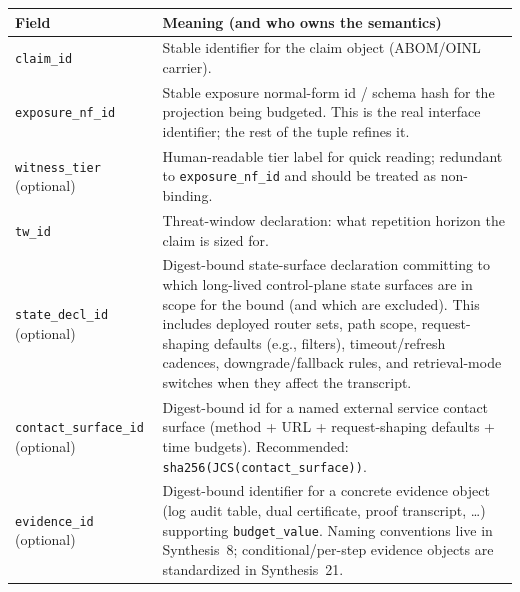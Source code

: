 \documentclass[11pt]{article}
\begin{document}
\begin{table}[t]
\centering
\begin{tabularx}{\linewidth}{@{}lX@{}}
\toprule
Field & Meaning (and who owns the semantics) \\
\midrule
\texttt{claim\_id} & Stable identifier for the claim object (ABOM/OINL carrier).\cite{series:abomoinl} \\
\texttt{exposure\_nf\_id} & Stable exposure normal-form id / schema hash for the projection being budgeted. This is the real interface identifier; the rest of the tuple refines it.\cite{series:traceifaces} \\
\texttt{witness\_tier} (optional) & Human-readable tier label for quick reading; redundant to \texttt{exposure\_nf\_id} and should be treated as non-binding.\cite{series:traceifaces} \\
\texttt{tw\_id} & Threat-window declaration: what repetition horizon the claim is sized for.\cite{series:threatwindows} \\
\texttt{state\_decl\_id} (optional) & Digest-bound state-surface declaration committing to which long-lived control-plane state surfaces are in scope for the bound (and which are excluded). This includes deployed router sets, path scope, request-shaping defaults (e.g., filters), timeout/refresh cadences, downgrade/fallback rules, and retrieval-mode switches when they affect the transcript.\cite{series:state1,series:deployedsurfaces,series:workedexample} \\
\texttt{contact\_surface\_id} (optional) & Digest-bound id for a named external service contact surface (method + URL + request-shaping defaults + time budgets). Recommended: \texttt{sha256(JCS(contact\_surface))}.\cite{rfc8785} \\
\texttt{evidence\_id} (optional) & Digest-bound identifier for a concrete evidence object (log audit table, dual certificate, proof transcript, \dots) supporting \texttt{budget\_value}. Naming conventions live in Synthesis~8; conditional/per-step evidence objects are standardized in Synthesis~21.\cite{series:notation,series:condcert} \\


\end{tabularx}
\end{table}
\end{document}
